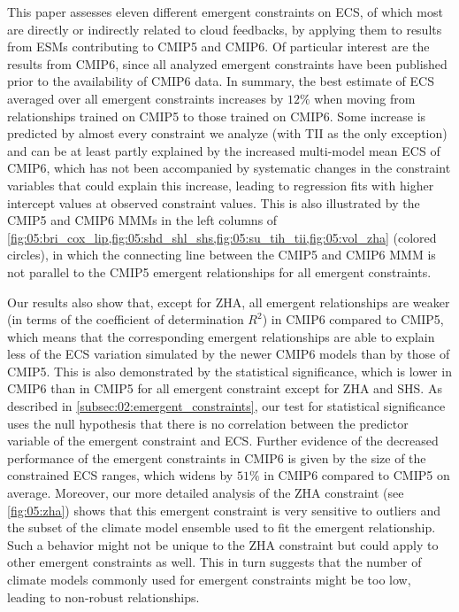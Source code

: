 This paper assesses eleven different emergent constraints on \ac{ECS}, of which
most are directly or indirectly related to cloud feedbacks, by applying them to
results from \acp{ESM} contributing to \acs{CMIP}5 and \acs{CMIP}6. Of
particular interest are the results from \acs{CMIP}6, since all analyzed
emergent constraints have been published prior to the availability of
\acs{CMIP}6 data. In summary, the best estimate of \ac{ECS} averaged over all
emergent constraints increases by $12 \unit{\%}$ when moving from relationships
trained on \acs{CMIP}5 to those trained on \acs{CMIP}6. Some increase is
predicted by almost every constraint we analyze (with TII as the only
exception) and can be at least partly explained by the increased multi-model
mean \ac{ECS} of \acs{CMIP}6, which has not been accompanied by systematic
changes in the constraint variables that could explain this increase, leading
to regression fits with higher intercept values at observed constraint values.
This is also illustrated by the \acs{CMIP}5 and \acs{CMIP}6 \acp{MMM} in the
left columns of
\cref{fig:05:bri_cox_lip,fig:05:shd_shl_shs,fig:05:su_tih_tii,fig:05:vol_zha}
(colored circles), in which the connecting line between the \acs{CMIP}5 and
\acs{CMIP}6 \ac{MMM} is not parallel to the \acs{CMIP}5 emergent relationships
for all emergent constraints.

Our results also show that, except for ZHA, all emergent relationships are
weaker (in terms of the coefficient of determination $R^2$) in \acs{CMIP}6
compared to \acs{CMIP}5, which means that the corresponding emergent
relationships are able to explain less of the \ac{ECS} variation simulated by
the newer \acs{CMIP}6 models than by those of \acs{CMIP}5. This is also
demonstrated by the statistical significance, which is lower in \acs{CMIP}6
than in \acs{CMIP}5 for all emergent constraint except for ZHA and SHS. As
described in \cref{subsec:02:emergent_constraints}, our test for statistical
significance uses the null hypothesis that there is no correlation between the
predictor variable of the emergent constraint and \ac{ECS}. Further evidence of
the decreased performance of the emergent constraints in \acs{CMIP}6 is given
by the size of the constrained \acs{ECS} ranges, which widens by $51 \unit{\%}$
in \acs{CMIP}6 compared to \acs{CMIP}5 on average. Moreover, our more detailed
analysis of the ZHA constraint (see \cref{fig:05:zha}) shows that this emergent
constraint is very sensitive to outliers and the subset of the climate model
ensemble used to fit the emergent relationship. Such a behavior might not be
unique to the ZHA constraint but could apply to other emergent constraints as
well. This in turn suggests that the number of climate models commonly used for
emergent constraints might be too low, leading to non-robust relationships.

